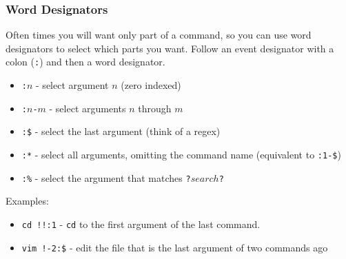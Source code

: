 \documentclass{beamer}
\begin{document}
\begin{frame}
    \frametitle{Word Designators}
    Often times you will want only part of a command, so you can use word
    designators to select which parts you want.\pause{} Follow an event designator with
    a colon (\texttt{:}) and then a word designator.
    \pause
    \begin{itemize}[<+->]
        \item \texttt{:$n$} - select argument $n$ (zero indexed)
        \item \texttt{:$n$-$m$} - select arguments $n$ through $m$
        \item \texttt{:\$} - select the last argument (think of a regex)
        \item \texttt{:*} - select all arguments, omitting the command name
            (equivalent to \texttt{:1-\$})
        \item[] \texttt{:\%} - select the argument that matches
                \texttt{?$search$?}
    \end{itemize}
    \pause
    Examples:
    \begin{itemize}[<+->]
        \item \texttt{cd !!:1} - \texttt{cd} to the first argument of the last
            command.
        \item \texttt{vim !-2:\$} - edit the file that is the last argument of
            two commands ago
    \end{itemize}
\end{frame}
\end{document}
